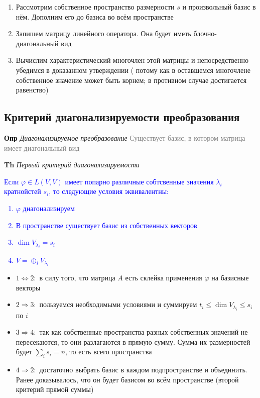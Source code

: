     \begin{enumerate}
        \item Рассмотрим собственное пространство размерности $s$ и произвольный базис в нём.
        Дополним его до базиса во всём пространстве
        \item Запишем матрицу линейного оператора.
        Она будет иметь блочно-диагональный вид
        \item Вычислим характеристический многочлен этой матрицы и непосредственно убедимся в доказанном утверждении (
        потому как в оставшемся многочлене собственное значение может быть корнем; в противном случае достигается
        равенство)
    \end{enumerate}

     \subsection{Критерий диагонализируемости преобразования}

    \textbf{Опр} \textit{Диагонализируемое преобразование} \textcolor{gray}{Существует базис, в котором матрица имеет
    диагональный вид}

    \textbf{Th} \textit{Первый критерий диагонализируемости}

    \textcolor{blue}{Если $\varphi \in L(V, V)$ имеет попарно различные собтсвенные значения $\lambda_i$
        кратнойстей $s_i$, то следующие условия эквивалентны:
    \begin{enumerate}
        \item $\varphi$ диагонализируем
        \item В пространстве существует базис из собственных векторов
        \item $\dim V_{\lambda_i} = s_i$
        \item $V = \oplus_i V_{\lambda_i}$
    \end{enumerate}             }

\begin{itemize}
    \item $1 \Leftrightarrow 2:$ в силу того, что матрица $A$ есть склейка применения $\varphi$ на базисные векторы
    \item $2 \Rightarrow 3:$ пользуемся необходимыми условиями и суммируем $t_i \leq \dim V_{\lambda_i} \leq s_i$ по $i$
    \item $3 \Rightarrow 4:$ так как собственные пространства разных собственных значений не пересекаются, то они
    разлагаются в прямую сумму.
    Сумма их размерностей будет $\sum_i s_i = n$, то есть всего пространства
    \item $4 \Rightarrow 2:$ достаточно выбрать базис в каждом подпространстве и объединить.
    Ранее доказывалось, что он будет базисом во всём пространстве (второй критерий прямой суммы)
\end{itemize}

